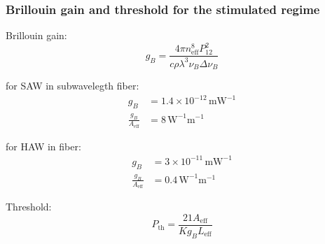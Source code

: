 \documentclass{beamer}
\begin{document}
\begin{frame}
\frametitle{Brillouin gain and threshold for the stimulated regime}

Brillouin gain:
\begin{equation*}
g_B = \frac{4\pi n_{\mathrm{eff}}^8P_{12}^2}{c\rho\lambda^3\nu_B\Delta\nu_B}
\end{equation*}

for SAW in subwavelegth fiber:
\begin{equation*}
\begin{aligned}
g_B &= 1.4\times 10^{-12}\,\mathrm{mW}^{-1}\\
\frac{g_B}{A_{\mathrm{eff}}} &= 8\, \mathrm{W}^{-1}\mathrm{m}^{-1}
\end{aligned}
\end{equation*}

for HAW in  fiber:
\begin{equation*}
\begin{aligned}
g_B &= 3\times 10^{-11}\,\mathrm{mW}^{-1}\\
\frac{g_B}{A_{\mathrm{eff}}} &= 0.4\, \mathrm{W}^{-1}\mathrm{m}^{-1}
\end{aligned}
\end{equation*}


Threshold:
\begin{equation*}
P_{\mathrm{th}}=\frac{21A_{\mathrm{eff}}}{Kg_BL_{\mathrm{eff}}}
\end{equation*}
\end{frame}

\end{document}
